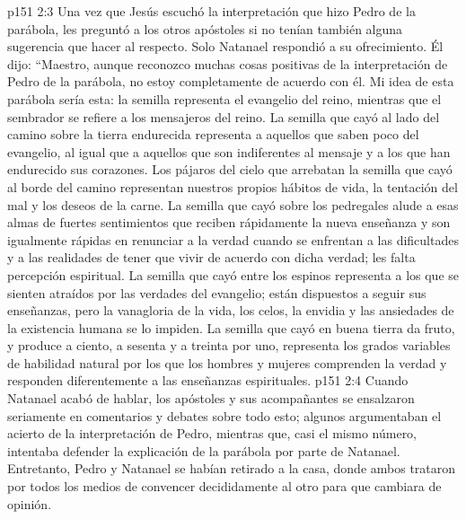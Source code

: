 \vs p151 2:3 Una vez que Jesús escuchó la interpretación que hizo Pedro de la parábola, les preguntó a los otros apóstoles si no tenían también alguna sugerencia que hacer al respecto. Solo Natanael respondió a su ofrecimiento. Él dijo: “Maestro, aunque reconozco muchas cosas positivas de la interpretación de Pedro de la parábola, no estoy completamente de acuerdo con él. Mi idea de esta parábola sería esta: la semilla representa el evangelio del reino, mientras que el sembrador se refiere a los mensajeros del reino. La semilla que cayó al lado del camino sobre la tierra endurecida representa a aquellos que saben poco del evangelio, al igual que a aquellos que son indiferentes al mensaje y a los que han endurecido sus corazones. Los pájaros del cielo que arrebatan la semilla que cayó al borde del camino representan nuestros propios hábitos de vida, la tentación del mal y los deseos de la carne. La semilla que cayó sobre los pedregales alude a esas almas de fuertes sentimientos que reciben rápidamente la nueva enseñanza y son igualmente rápidas en renunciar a la verdad cuando se enfrentan a las dificultades y a las realidades de tener que vivir de acuerdo con dicha verdad; les falta percepción espiritual. La semilla que cayó entre los espinos representa a los que se sienten atraídos por las verdades del evangelio; están dispuestos a seguir sus enseñanzas, pero la vanagloria de la vida, los celos, la envidia y las ansiedades de la existencia humana se lo impiden. La semilla que cayó en buena tierra da fruto, y produce a ciento, a sesenta y a treinta por uno, representa los grados variables de habilidad natural por los que los hombres y mujeres comprenden la verdad y responden diferentemente a las enseñanzas espirituales.
\vs p151 2:4 Cuando Natanael acabó de hablar, los apóstoles y sus acompañantes se ensalzaron seriamente en comentarios y debates sobre todo esto; algunos argumentaban el acierto de la interpretación de Pedro, mientras que, casi el mismo número, intentaba defender la explicación de la parábola por parte de Natanael. Entretanto, Pedro y Natanael se habían retirado a la casa, donde ambos trataron por todos los medios de convencer decididamente al otro para que cambiara de opinión.
